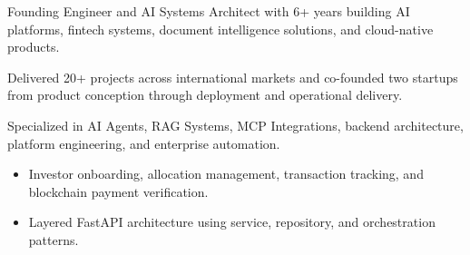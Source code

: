 \documentclass[10pt,a4paper,withhyper]{altacv}
\begin{document}


\makecvheader



Founding Engineer and AI Systems Architect with 6+ years building AI platforms, fintech systems, document intelligence solutions, and cloud-native products.

Delivered 20+ projects across international markets and co-founded two startups from product conception through deployment and operational delivery.

Specialized in AI Agents, RAG Systems, MCP Integrations, backend architecture, platform engineering, and enterprise automation.


\begin{minipage}[t]{0.48\textwidth}
\end{minipage}
\hfill
\begin{minipage}[t]{0.48\textwidth}
\end{minipage}

\vspace{0.5em}

\begin{minipage}[t]{0.48\textwidth}
\end{minipage}
\hfill
\begin{minipage}[t]{0.48\textwidth}
\end{minipage}



\begin{itemize}
\item Investor onboarding, allocation management, transaction tracking, and blockchain payment verification.
\item Layered FastAPI architecture using service, repository, and orchestration patterns.
\end{itemize}
\end{document}
